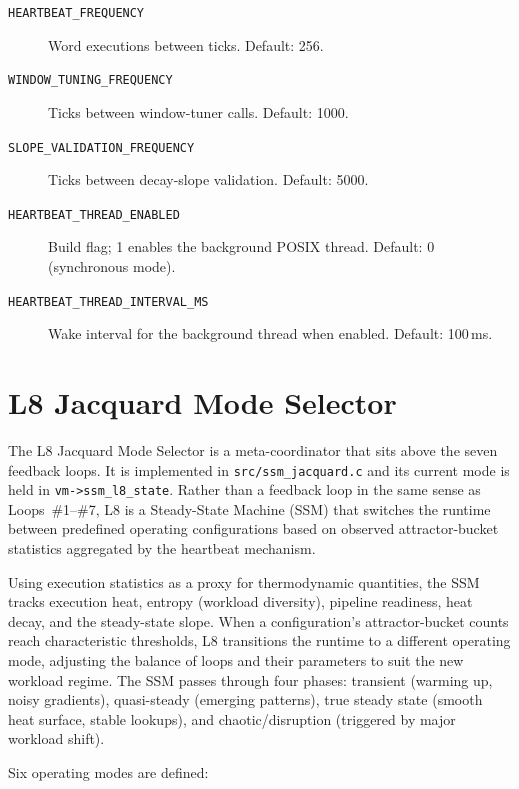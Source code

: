 \begin{description}
  \item[\texttt{HEARTBEAT\_FREQUENCY}] Word executions between ticks.
    Default: 256.
  \item[\texttt{WINDOW\_TUNING\_FREQUENCY}] Ticks between window-tuner
    calls. Default: 1000.
  \item[\texttt{SLOPE\_VALIDATION\_FREQUENCY}] Ticks between decay-slope
    validation. Default: 5000.
  \item[\texttt{HEARTBEAT\_THREAD\_ENABLED}] Build flag; 1 enables the
    background POSIX thread. Default: 0 (synchronous mode).
  \item[\texttt{HEARTBEAT\_THREAD\_INTERVAL\_MS}] Wake interval for the
    background thread when enabled. Default: 100\,ms.
\end{description}

\section{L8 Jacquard Mode Selector}
\label{vol1:sec:physics:l8}


The L8 Jacquard Mode Selector is a meta-coordinator that sits above the seven
feedback loops. It is implemented in \texttt{src/ssm\_jacquard.c} and its
current mode is held in \texttt{vm->ssm\_l8\_state}. Rather than a feedback
loop in the same sense as Loops~\#1--\#7, L8 is a Steady-State Machine (SSM)
that switches the runtime between predefined operating configurations based on
observed attractor-bucket statistics aggregated by the heartbeat mechanism.

Using execution statistics as a proxy for thermodynamic quantities, the SSM
tracks execution heat, entropy (workload diversity), pipeline readiness, heat
decay, and the steady-state slope. When a configuration's attractor-bucket
counts reach characteristic thresholds, L8 transitions the runtime to a
different operating mode, adjusting the balance of loops and their parameters
to suit the new workload regime. The SSM passes through four phases: transient
(warming up, noisy gradients), quasi-steady (emerging patterns), true steady
state (smooth heat surface, stable lookups), and chaotic/disruption
(triggered by major workload shift).

Six operating modes are defined:

